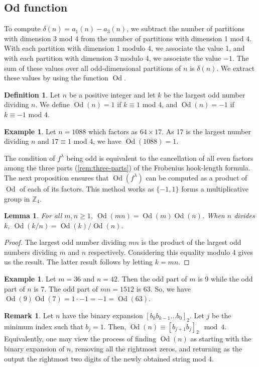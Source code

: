 \documentclass[12pt]{amsart}
\newtheorem{lemma}[theorem]{Lemma}
\theoremstyle{definition}
\newtheorem{definition}[theorem]{Definition}
\newtheorem{example}[theorem]{Example}
\newtheorem{remark}[theorem]{Remark}
\numberwithin{equation}{section}
\newcommand{\la}{\lambda}
\DeclareMathOperator{\Od}{Od}
\begin{document}
\subsection{\textnormal{Od} function}\label{odsubs}
To compute $\delta(n) = a_1(n) - a_3(n)$, we subtract the number of partitions with dimension 3 mod 4 from the number of partitions with dimension 1 mod 4. With each partition with dimension 1 modulo 4, we associate the value 1, and with each partition with dimension 3 modulo 4, we associate the value $-1$. The sum of these values over all odd-dimensional partitions of $n$ is $\delta(n)$. We extract these values by using the function $\Od$. 
\begin{definition}
Let $n$ be a positive integer and let $k$ be the largest odd number dividing $n$. We define $\Od(n) = 1$ if $k\equiv 1$ mod 4, and $\Od(n) = -1$ if $k\equiv -1$ mod 4.
\end{definition}
\begin{example}
    Let $n = 1088$ which factors as $64\times 17$. As 17 is the largest number dividing $n$ and $17\equiv 1$ mod 4, we have $\Od(1088) = 1$.  
\end{example}
The condition of $f^\la$ being odd is equivalent to the cancellation of all even factors among the three parts (\cref{rem:three-parts}) of the Frobenius hook-length formula. The next proposition ensures that $\Od(f^\la)$ can be computed as a product of $\Od$ of each of its factors. This method works as $\{-1,1\}$ forms a multiplicative group in $\mathbb{Z}_4$.
\begin{lemma}\label{lem:odmulti}
For all $m, n\geq 1$, $\Od(mn) = \Od(m)\Od(n)$. When $n$ divides $k$, $\Od(k/n) = \Od(k)/\Od(n)$.
\end{lemma}
\begin{proof}
The largest odd number dividing $mn$ is the product of the largest odd numbers dividing $m$ and $n$ respectively. Considering this equality modulo 4 gives us the result. The latter result follows by letting $k = mn$.
\end{proof}
\begin{example}
    Let $m= 36$ and $n = 42$. Then the odd part of $m$ is 9 while the odd part of $n$ is 7. The odd part of $mn = 1512$ is 63. So, we have $\Od(9)\Od(7) = 1\cdot -1 = -1 = \Od(63)$.
\end{example}

\begin{remark}\label{rem:odbinary}
Let $n$ have the binary expansion $[b_kb_{k-1}\ldots b_0]_2$. Let $j$ be the minimum index such that $b_j = 1$. Then, $\Od(n) \equiv [b_{j+1}b_{j}]_2 \mod 4$. Equivalently, one may view the process of finding $\Od(n)$ as starting with the binary expansion of $n$, removing all the rightmost zeros, and returning as the output the rightmost two digits of the newly obtained string mod 4.
\end{remark}
\end{document}
